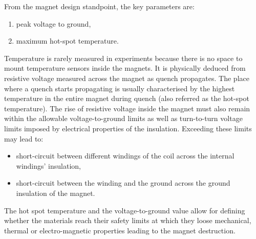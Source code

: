 From the magnet design standpoint, the key parameters are:
\begin{enumerate}
    \item peak voltage to ground,
    \item maximum hot-spot temperature.
\end{enumerate}

Temperature is rarely measured in experiments because there is no space to mount temperature sensors inside the magnets. It is physically deduced from resistive voltage measured across the magnet as quench propagates. The place where a quench starts propagating is usually characterised by the highest temperature in the entire magnet during quench (also referred as the hot-spot temperature). The rise of resistive voltage inside the magnet must also remain within the allowable voltage-to-ground limits as well as turn-to-turn voltage limits imposed by electrical properties of the insulation. Exceeding these limits may lead to:

\begin{itemize}
    \item short-circuit between different windings of the coil across the internal windings' insulation,
    \item short-circuit between the winding and the ground across the ground insulation of the magnet.
\end{itemize}

The hot spot temperature and the voltage-to-ground value allow for defining whether the materials reach their safety limits at which they loose mechanical, thermal or electro-magnetic properties leading to the magnet destruction.
